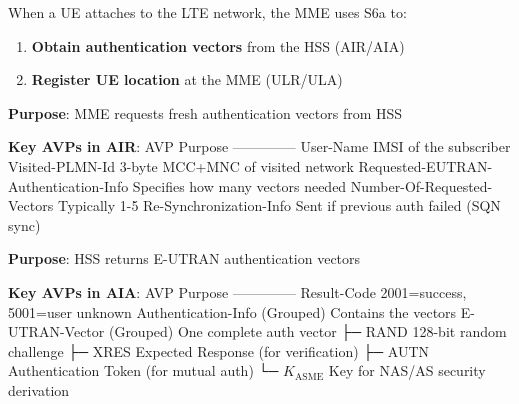 

\CNchained{}

When a UE attaches to the LTE network, the MME uses S6a to:

\begin{enumerate}
\def\labelenumi{\arabic{enumi}.}
\tightlist
\item
  \textbf{Obtain authentication vectors} from the HSS (AIR/\allowbreak{}AIA)
\item
  \textbf{Register UE location} at the MME (ULR/\allowbreak{}ULA)
\end{enumerate}




\textbf{Purpose}: MME requests fresh authentication vectors from HSS

\textbf{Key AVPs in AIR}:\CNbr{}\textbar{} AVP \textbar{} Purpose \textbar{}\CNbr{}\textbar{}—–\textbar{}———\textbar{}\CNbr{}\textbar{} User-Name \textbar{} IMSI of the subscriber \textbar{}\CNbr{}\textbar{} Visited-PLMN-Id \textbar{} 3-byte MCC+MNC of visited network \textbar{}\CNbr{}\textbar{} Requested-EUTRAN-Authentication-Info \textbar{} Specifies how many vectors needed \textbar{}\CNbr{}\textbar{} Number-Of-Requested-Vectors \textbar{} Typically 1-5 \textbar{}\CNbr{}\textbar{} Re-Synchronization-Info \textbar{} Sent if previous auth failed (SQN sync) \textbar{}


\textbf{Purpose}: HSS returns E-UTRAN authentication vectors

\textbf{Key AVPs in AIA}:\CNbr{}\textbar{} AVP \textbar{} Purpose \textbar{}\CNbr{}\textbar{}—–\textbar{}———\textbar{}\CNbr{}\textbar{} Result-Code \textbar{} 2001=success, 5001=user unknown \textbar{}\CNbr{}\textbar{} Authentication-Info (Grouped) \textbar{} Contains the vectors \textbar{}\CNbr{}\textbar{} E-UTRAN-Vector (Grouped) \textbar{} One complete auth vector \textbar{}\CNbr{}\textbar{} ├─ RAND \textbar{} 128-bit random challenge \textbar{}\CNbr{}\textbar{} ├─ XRES \textbar{} Expected Response (for verification) \textbar{}\CNbr{}\textbar{} ├─ AUTN \textbar{} Authentication Token (for mutual auth) \textbar{}\CNbr{}\textbar{} └─ \ensuremath{K_{\mathrm{ASME}}} \textbar{} Key for NAS/\allowbreak{}AS security derivation \textbar{}

